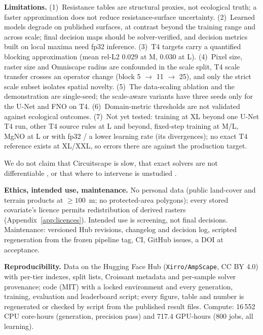 \documentclass{article}
\newcommand{\relltwo}{rel-L2}
\newcommand{\code}[1]{\texttt{#1}}
\begin{document}
\textbf{Limitations.} (1)~Resistance tables are structural proxies, not ecological truth; a faster approximation does not reduce resistance-surface uncertainty. (2)~Learned models degrade on published surfaces, at contrast beyond the training range and across scale; final decision maps should be solver-verified, and decision metrics built on local maxima need fp32 inference. (3)~T4 targets carry a quantified blocking approximation (mean \relltwo{} 0.029 at M, 0.030 at L). (4)~Pixel size, raster size and Omniscape radius are confounded in the scale split, T4 scale transfer crosses an operator change (block 5 $\rightarrow$ 11 $\rightarrow$ 25), and only the strict scale subset isolates spatial novelty. (5)~The data-scaling ablation and the demonstration are single-seed; the scale-aware variants have three seeds only for the U-Net and FNO on T4. (6)~Domain-metric thresholds are not validated against ecological outcomes. (7)~Not yet tested: training at XL beyond one U-Net T4 run, other T4 source rules at L and beyond, fixed-step training at M/L, MgNO at L or with fp32 / a lower learning rate (its divergences); no exact T4 reference exists at XL/XXL, so errors there are against the production target.

We do not claim that Circuitscape is slow, that exact solvers are not differentiable \citep{vanmoorter2026,boussange2025}, or that where to intervene is unstudied \citep{mcrae2012,moilanen2022,daigle2020,hamonic2025}.

\textbf{Ethics, intended use, maintenance.} No personal data (public land-cover and terrain products at $\ge 100$~m; no protected-area polygons); every stored covariate's licence permits redistribution of derived rasters (Appendix~\ref{app:licences}). Intended use is screening, not final decisions. Maintenance: versioned Hub revisions, changelog and decision log, scripted regeneration from the frozen pipeline tag, CI, GitHub issues, a DOI at acceptance.

\textbf{Reproducibility.} Data on the Hugging Face Hub (\code{Xirro/AmpScape}, CC BY 4.0) with per-tier indexes, split lists, Croissant metadata and per-sample solver provenance; code (MIT) with a locked environment and every generation, training, evaluation and leaderboard script; every figure, table and number is regenerated or checked by script from the published result files. Compute: 16\,552 CPU core-hours (generation, precision pass) and 717.4 GPU-hours (800 jobs, all learning).
\end{document}
